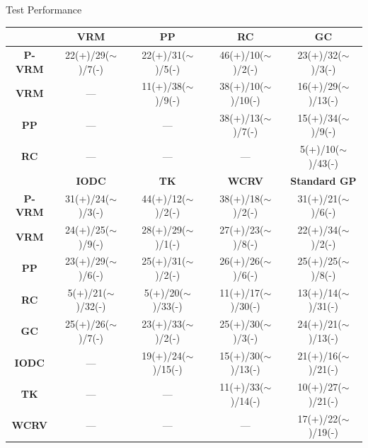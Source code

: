 \documentclass[aspectratio=1610]{beamer}
\begin{document}
\begin{frame}{Test Performance}
        \begin{table}[!tb]
            \centering
            \scriptsize
            \begin{tabular}{ccccc}%
                \toprule%
                & \textbf{VRM}            & \textbf{PP}              & \textbf{RC}              & \textbf{GC}              \\%
                \midrule%
                \textbf{P-VRM} & 22(+)/29($\sim$)/7({-}) & 22(+)/31($\sim$)/5({-})  & 46(+)/10($\sim$)/2({-})& 23(+)/32($\sim$)/3({-})\\%
                \textbf{VRM}   & ---                     & 11(+)/38($\sim$)/9({-})  & 38(+)/10($\sim$)/10({-}) & 16(+)/29($\sim$)/13({-}) \\%
                \textbf{PP}    & ---                     & ---                      & 38(+)/13($\sim$)/7({-})  & 15(+)/34($\sim$)/9({-})  \\%
                \textbf{RC}    & ---                     & ---                      & ---                      & 5(+)/10($\sim$)/43({-})  \\%
                \midrule%
                & \textbf{IODC}           & \textbf{TK}              & \textbf{WCRV}            & \textbf{Standard GP}     \\%
                \midrule%
                \textbf{P-VRM} & 31(+)/24($\sim$)/3({-}) & 44(+)/12($\sim$)/2({-})  & 38(+)/18($\sim$)/2({-})& 31(+)/21($\sim$)/6({-})\\%
                \textbf{VRM}   & 24(+)/25($\sim$)/9({-}) & 28(+)/29($\sim$)/1({-})  & 27(+)/23($\sim$)/8({-})& 22(+)/34($\sim$)/2({-})\\%
                \textbf{PP}    & 23(+)/29($\sim$)/6({-}) & 25(+)/31($\sim$)/2({-})  & 26(+)/26($\sim$)/6({-})& 25(+)/25($\sim$)/8({-})\\%
                \textbf{RC}    & 5(+)/21($\sim$)/32({-}) & 5(+)/20($\sim$)/33({-})  & 11(+)/17($\sim$)/30({-})& 13(+)/14($\sim$)/31({-})\\%
                \textbf{GC}    & 25(+)/26($\sim$)/7({-}) & 23(+)/33($\sim$)/2({-})  & 25(+)/30($\sim$)/3({-})& 24(+)/21($\sim$)/13({-})\\%
                \textbf{IODC}  & ---                     & 19(+)/24($\sim$)/15({-}) & 15(+)/30($\sim$)/13({-}) & 21(+)/16($\sim$)/21({-}) \\%
                \textbf{TK}    & ---                     & ---                      & 11(+)/33($\sim$)/14({-}) & 10(+)/27($\sim$)/21({-}) \\%
                \textbf{WCRV}  & ---                     & ---                      & ---                      & 17(+)/22($\sim$)/19({-}) \\%
                \bottomrule%
            \end{tabular}%
        \end{table}
    \end{frame}
\end{document}
